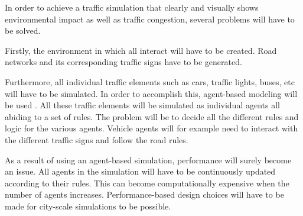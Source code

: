 In order to achieve a traffic simulation that clearly and visually shows environmental impact as well as traffic congestion, several problems will have to be solved.

Firstly, the environment in which all  interact will have to be created. Road networks and its corresponding traffic signs have to be generated.

Furthermore, all individual traffic elements such as cars, traffic lights, buses, etc will have to be simulated. In order to accomplish this, agent-based modeling will be used \cite{agent-based-modeling}. All these traffic elements will be simulated as individual agents all abiding to a set of rules. The problem will be to decide all the different rules and logic for the various agents. Vehicle agents will for example need to interact with the different traffic signs and follow the road rules.  

As a result of using an agent-based simulation, performance will surely become an issue. All agents in the simulation will have to be continuously updated according to their rules. This can become computationally expensive when the number of agents increases. Performance-based design choices will have to be made for city-scale simulations to be possible.